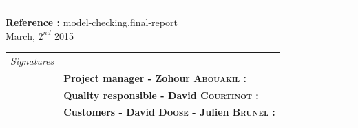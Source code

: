 \documentclass{report}
\begin{document}
\begin{titlepage}


\vspace*{4.5cm}

\noindent
\begin{minipage}{0.35\linewidth}
    \begin{flushright}
        \printauthor
    \end{flushright}
\end{minipage} \hspace{15pt}
%
\begin{minipage}{0.02\linewidth}
    \rule{1pt}{175pt}
\end{minipage} \hspace{-10pt}
%
\begin{minipage}{0.6\linewidth}
\vspace{5pt}
\newenvironment{test}{\begin{center}}{\end{center}}
\hspace{10pt}
\begin{minipage}{\linewidth} 
\textbf{Reference :} model-checking.final-report ~\\
March, $2^{nd}$ 2015
\end{minipage}
\end{minipage}

\vspace{8cm}
\begin{minipage}{0.20\linewidth}
    \begin{flushright}
       
        \begin{tabular}{ll}
	 \textit{Signatures} & \\
			& \textbf{Project manager - Zohour \textsc{Abouakil} :} \\
            & \textbf{Quality responsible - David \textsc{Courtinot} :} \\
            & \textbf{Customers - David \textsc{Doose} - Julien \textsc{Brunel} :} \\
        \end{tabular}
    \end{flushright}
\end{minipage}

\end{titlepage}
\restoregeometry
\tableofcontents
{}
\end{document}
